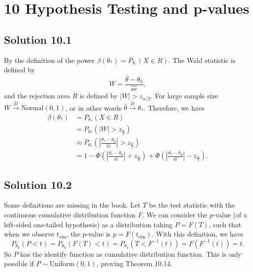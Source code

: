\section*{10 Hypothesis Testing and p-values}

\subsection*{Solution 10.1}

By the definition of the power $\beta(\theta_*) = P_{\theta_*}(X \in R)$.
The Wald statistic is defined by
\begin{equation*}
    W = \frac{\hat{\theta} - \theta_0}{\hat{se}},
\end{equation*}
and the rejection area $R$ is defined by $|W| > z_{\alpha/2}$.
For large sample size $W \xrightarrow{D} \mathrm{Normal}(0, 1)$, or in other words $\hat{\theta} \xrightarrow{D} \theta_*$.
Therefore, we have
\begin{equation*}
    \begin{split}
        \beta(\theta_*)
            &= P_{\theta_*}(X \in R) \\
            &= P_{\theta_*}(|W| > z_{\frac{\alpha}{2}}) \\
            &\approx P_{\theta_*}\left(\left|\frac{\theta_* - \theta_0}{\hat{se}}\right| > z_{\frac{\alpha}{2}}\right) \\
            &= 1 - \Phi\left(\left|\frac{\theta_* - \theta_0}{\hat{se}}\right| + z_{\frac{\alpha}{2}}\right)
                + \Phi\left(\left|\frac{\theta_* - \theta_0}{\hat{se}}\right| - z_{\frac{\alpha}{2}}\right).
    \end{split}
\end{equation*}


\subsection*{Solution 10.2}

Some definitions are missing in the book.
Let $T$ be the test statistic with the continuous cumulative distribution function $F$.
We can consider the $p$-value (of a left-sided one-tailed hypothesis) as a distribution taking $P = F(T)$, such that when we observe $t_{\mathrm{obs}}$, the $p$-value is $p = F(t_{\mathrm{obs}})$.
With this definition, we have
\begin{equation*}
    P_{\theta_0}(P < t)
        = P_{\theta_0}(F(T) < t)
        = P_{\theta_0}(T < F^{-1}(t))
        = F(F^{-1}(t))
        = t.
\end{equation*}
So $P$ has the identify function as cumulative distribution function.
This is only possible if $P \sim \mathrm{Uniform}(0, 1)$, proving Theorem 10.14.


